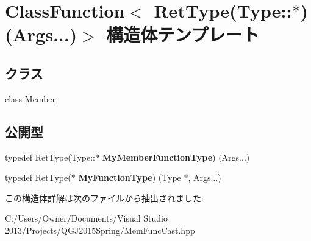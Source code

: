 \hypertarget{struct_class_function_3_01_ret_type_07_type_1_1_5_08_07_args_8_8_8_08_4}{}\section{Class\+Function$<$ Ret\+Type(Type\+:\+:$\ast$)(Args...)$>$ 構造体テンプレート}
\label{struct_class_function_3_01_ret_type_07_type_1_1_5_08_07_args_8_8_8_08_4}
\subsection*{クラス}
\begin{DoxyCompactItemize}
\item 
class \hyperlink{class_class_function_3_01_ret_type_07_type_1_1_5_08_07_args_8_8_8_08_4_1_1_member}{Member}
\end{DoxyCompactItemize}
\subsection*{公開型}
\begin{DoxyCompactItemize}
\item 
typedef Ret\+Type(Type\+::$\ast$ {\bfseries My\+Member\+Function\+Type}) (Args...)\hypertarget{struct_class_function_3_01_ret_type_07_type_1_1_5_08_07_args_8_8_8_08_4_aa9292dfd10193b087e19a64e94a66bf0}{}\label{struct_class_function_3_01_ret_type_07_type_1_1_5_08_07_args_8_8_8_08_4_aa9292dfd10193b087e19a64e94a66bf0}

\item 
typedef Ret\+Type($\ast$ {\bfseries My\+Function\+Type}) (Type $\ast$, Args...)\hypertarget{struct_class_function_3_01_ret_type_07_type_1_1_5_08_07_args_8_8_8_08_4_aa46a3b8a32fc8f1a6e2a2955179b9c95}{}\label{struct_class_function_3_01_ret_type_07_type_1_1_5_08_07_args_8_8_8_08_4_aa46a3b8a32fc8f1a6e2a2955179b9c95}

\end{DoxyCompactItemize}


この構造体詳解は次のファイルから抽出されました\+:\begin{DoxyCompactItemize}
\item 
C\+:/\+Users/\+Owner/\+Documents/\+Visual Studio 2013/\+Projects/\+Q\+G\+J2015\+Spring/Mem\+Func\+Cast.\+hpp\end{DoxyCompactItemize}
